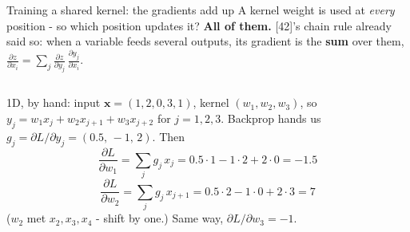 \documentclass[aspectratio=169]{beamer}
\begin{document}
\begin{frame}{Training a shared kernel: the gradients add up}
  \small
  A kernel weight is used at \emph{every} position - so which position updates it?
  \textbf{All of them.} [42]'s chain rule already said so: when a variable feeds several
  outputs, its gradient is the \textbf{sum} over them,
  $\frac{\partial z}{\partial x_i} = \sum_j \frac{\partial z}{\partial y_j}\,
  \frac{\partial y_j}{\partial x_i}$.
  \vskip 4pt
  \begin{columns}[T]
    1D, by hand: input $\mathbf{x}=(1,2,0,3,1)$, kernel $(w_1,w_2,w_3)$, so
    $y_j = w_1x_j + w_2x_{j+1} + w_3x_{j+2}$ for $j=1,2,3$. Backprop hands us
    $g_j = \partial L/\partial y_j = (0.5,\,-1,\,2)$. Then
    \[
      \frac{\partial L}{\partial w_1} = \sum_j g_j\,x_j
        = 0.5\cdot1 - 1\cdot2 + 2\cdot0 = -1.5
    \]
    \[
      \frac{\partial L}{\partial w_2} = \sum_j g_j\,x_{j+1}
        = 0.5\cdot2 - 1\cdot0 + 2\cdot3 = 7
    \]
    ($w_2$ met $x_2, x_3, x_4$ - shift by one.) Same way, $\partial L/\partial w_3 = -1$.
    \vskip 6pt
  \end{columns}
\end{frame}
\end{document}

